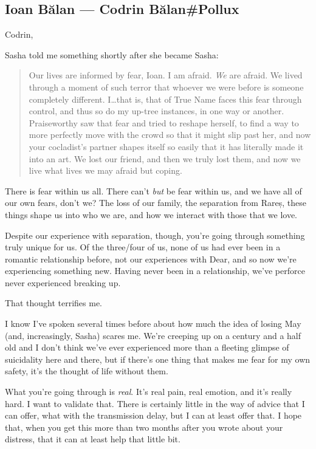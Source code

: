 \hypertarget{ioan-bux103lan-codrin-bux103lanpollux}{%
\subsection{Ioan Bălan — Codrin Bălan\#Pollux}\label{ioan-bux103lan-codrin-bux103lanpollux}}

Codrin,

Sasha told me something shortly after she became Sasha:

\begin{quote}
Our lives are informed by fear, Ioan. I am afraid. \emph{We} are afraid. We lived through a moment of such terror that whoever we were before is someone completely different. I\ldots that is, that of True Name faces this fear through control, and thus so do my up-tree instances, in one way or another. Praiseworthy saw that fear and tried to reshape herself, to find a way to more perfectly move with the crowd so that it might slip past her, and now your cocladist's partner shapes itself so easily that it has literally made it into an art. We lost our friend, and then we truly lost them, and now we live what lives we may afraid but coping.
\end{quote}

There is fear within us all. There can't \emph{but} be fear within us, and we have all of our own fears, don't we? The loss of our family, the separation from Rareș, these things shape us into who we are, and how we interact with those that we love.

Despite our experience with separation, though, you're going through something truly unique for us. Of the three/four of us, none of us had ever been in a romantic relationship before, not our experiences with Dear, and so now we're experiencing something new. Having never been in a relationship, we've perforce never experienced breaking up.

That thought terrifies me.

I know I've spoken several times before about how much the idea of losing May (and, increasingly, Sasha) scares me. We're creeping up on a century and a half old and I don't think we've ever experienced more than a fleeting glimpse of suicidality here and there, but if there's one thing that makes me fear for my own safety, it's the thought of life without them.

What you're going through is \emph{real}. It's real pain, real emotion, and it's really hard. I want to validate that. There is certainly little in the way of advice that I can offer, what with the transmission delay, but I can at least offer that. I hope that, when you get this more than two months after you wrote about your distress, that it can at least help that little bit.

